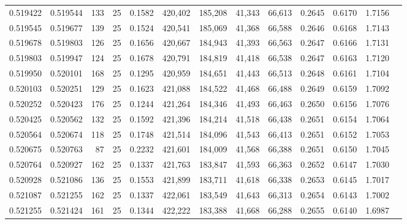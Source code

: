 \begin{tabular}{rrrrrrrrrrrrr}
0.519422 & 0.519544 &   133 &  25 &                                     0.1582 & 420,402 & 185,208 &  41,343 &  66,613 & 0.2645 & 0.6170 & 1.7156 \\
0.519545 & 0.519677 &   139 &  25 &                                     0.1524 & 420,541 & 185,069 &  41,368 &  66,588 & 0.2646 & 0.6168 & 1.7143 \\
0.519678 & 0.519803 &   126 &  25 &                                     0.1656 & 420,667 & 184,943 &  41,393 &  66,563 & 0.2647 & 0.6166 & 1.7131 \\
0.519803 & 0.519947 &   124 &  25 &                                     0.1678 & 420,791 & 184,819 &  41,418 &  66,538 & 0.2647 & 0.6163 & 1.7120 \\
0.519950 & 0.520101 &   168 &  25 &                                     0.1295 & 420,959 & 184,651 &  41,443 &  66,513 & 0.2648 & 0.6161 & 1.7104 \\
0.520103 & 0.520251 &   129 &  25 &                                     0.1623 & 421,088 & 184,522 &  41,468 &  66,488 & 0.2649 & 0.6159 & 1.7092 \\
0.520252 & 0.520423 &   176 &  25 &                                     0.1244 & 421,264 & 184,346 &  41,493 &  66,463 & 0.2650 & 0.6156 & 1.7076 \\
0.520425 & 0.520562 &   132 &  25 &                                     0.1592 & 421,396 & 184,214 &  41,518 &  66,438 & 0.2651 & 0.6154 & 1.7064 \\
0.520564 & 0.520674 &   118 &  25 &                                     0.1748 & 421,514 & 184,096 &  41,543 &  66,413 & 0.2651 & 0.6152 & 1.7053 \\
0.520675 & 0.520763 &    87 &  25 &                                     0.2232 & 421,601 & 184,009 &  41,568 &  66,388 & 0.2651 & 0.6150 & 1.7045 \\
0.520764 & 0.520927 &   162 &  25 &                                     0.1337 & 421,763 & 183,847 &  41,593 &  66,363 & 0.2652 & 0.6147 & 1.7030 \\
0.520928 & 0.521086 &   136 &  25 &                                     0.1553 & 421,899 & 183,711 &  41,618 &  66,338 & 0.2653 & 0.6145 & 1.7017 \\
0.521087 & 0.521255 &   162 &  25 &                                     0.1337 & 422,061 & 183,549 &  41,643 &  66,313 & 0.2654 & 0.6143 & 1.7002 \\
0.521255 & 0.521424 &   161 &  25 &                                     0.1344 & 422,222 & 183,388 &  41,668 &  66,288 & 0.2655 & 0.6140 & 1.6987 \\

\end{tabular}
